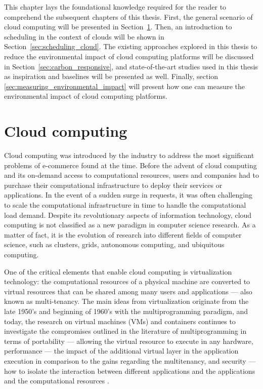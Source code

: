 This chapter lays the foundational knowledge required for the reader to comprehend the subsequent chapters of this thesis. First, the general scenario of cloud computing will be presented in Section~\ref{sec:cloud}. Then, an introduction to scheduling in the context of clouds will be shown in Section~\ref{sec:scheduling_cloud}. The existing approaches explored in this thesis to reduce the environmental impact of cloud computing platforms will be discussed in Section~\ref{sec:carbon_responsive}, and state-of-the-art studies used in this thesis as inspiration and baselines will be presented as well. Finally, section \ref{sec:measuring_environmental_impact} will present how one can measure the environmental impact of cloud computing platforms.

\section{Cloud computing}

\label{sec:cloud}

Cloud computing was introduced by the industry to address the most significant problems of e-commerce found at the time. Before the advent of cloud computing and its on-demand access to computational resources, users and companies had to purchase their computational infrastructure to deploy their services or applications. In the event of a sudden surge in requests, it was often challenging to scale the computational infrastructure in time to handle the computational load demand. Despite its revolutionary aspects of information technology, cloud computing is not classified as a new paradigm in computer science research. As a matter of fact, it is the evolution of research into different fields of computer science, such as clusters, grids, autonomous computing, and ubiquitous computing. 

One of the critical elements that enable cloud computing is virtualization technology: the computational resources of a physical machine are converted to virtual resources that can be shared among many users and applications --- also known as multi-tenancy.  The main ideas from virtualization originate from the late 1950's and beginning of 1960's with the multiprogramming paradigm, and today, the research on virtual machines (VMs) and containers continues to investigate the compromises outlined in the literature of multiprogramming in terms of portability --- allowing the virtual resource to execute in any hardware,  performance --- the impact of the additional virtual layer in the application execution in comparison to the gains regarding the multitenancy, and security --- how to isolate the interaction between different applications and the applications and the computational resources \cite{randall2020_virtualization}.

